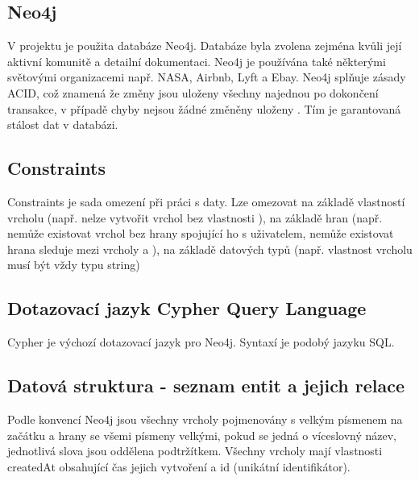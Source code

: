 \documentclass[12pt, a4paper,
 twoside,        %
 openright
]{report}
\begin{document}
    \subsection{Neo4j}
        V projektu je použita databáze Neo4j. Databáze byla zvolena zejména kvůli její aktivní komunitě a detailní dokumentaci. Neo4j je používána také některými světovými organizacemi např. NASA, Airbnb, Lyft a Ebay. Neo4j splňuje zásady ACID, což znamená že změny jsou uloženy všechny najednou po dokončení transakce, v případě chyby nejsou žádné změněny uloženy \cite{ACIDRules}. Tím je garantovaná stálost dat v databázi. \cite{aboutNeo4j}
    \subsection{Constraints}
        Constraints je sada omezení při práci s daty. Lze omezovat na základě vlastností vrcholu (např. nelze vytvořit vrchol  bez vlastnosti ), na základě hran (např. nemůže existovat vrchol  bez hrany  spojující ho s uživatelem, nemůže existovat hrana sleduje mezi vrcholy  a ), na základě datových typů (např. vlastnost  vrcholu  musí být vždy typu string)
    \subsection{Dotazovací jazyk Cypher Query Language}
        Cypher je výchozí dotazovací jazyk pro Neo4j. Syntaxí je podobý jazyku SQL. \cite{CypherQL}
        
    \subsection{Datová struktura - seznam entit a jejich relace}
        Podle konvencí Neo4j jsou všechny vrcholy pojmenovány s velkým písmenem na začátku a hrany se všemi písmeny velkými, pokud se jedná o víceslovný název, jednotlivá slova jsou oddělena podtržítkem. \cite{Neo4jNamingRules}
            Všechny vrcholy mají vlastnosti createdAt obsahující čas jejich vytvoření a id (unikátní identifikátor).
\end{document}
